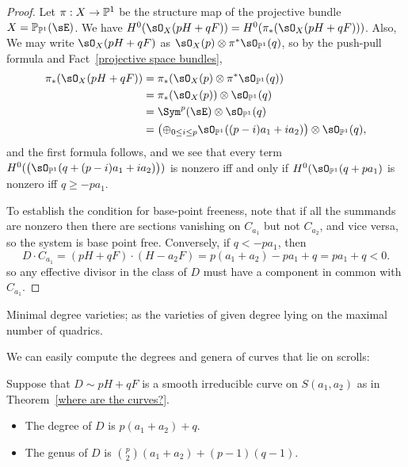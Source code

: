 \begin{proof} Let $\pi:X\to \PP^{1}$ be the structure map of the projective bundle $X = \PP_{\PP^{1}}(\sE)$.
We have $H^{0}(\sO_{X}(pH+qF)) = H^{0}(\pi_{*}(\sO_{X}(pH+qF)))$. Also, 
We may write $\sO_{X}(pH+qF)$ as $\sO_{X}(p) \otimes \pi^{*}\sO_{\PP^{1}}(q)$, so by the push-pull formula
and Fact~\ref{projective space bundles},
\begin{align*}
\pi_{*}(\sO_{X}(pH+qF)) &= \pi_{*}(\sO_{X}(p) \otimes \pi^{*}\sO_{\PP^{1}}(q)) \\
 &= \pi_{*}(\sO_{X}(p))\otimes \sO_{\PP^{1}}(q)\\
&=  \Sym^{p}(\sE)\otimes \sO_{\PP^{1}}(q)\\
&=  \bigl(\oplus_{0\leq i\leq p} \sO_{\PP^{1}}((p-i)a_{1}+i a_{2})\bigr) \otimes \sO_{\PP^{1}}(q),
\end{align*}
and the first formula follows, and we see that every term 
$H^{0}(\bigl(\sO_{\PP^{1}}(q + (p-i)a_{1}+i a_{2})\bigr))$ is nonzero iff and only if 
$H^{0}(\sO_{\PP^{1}}(q + pa_{1})$ is nonzero iff $q\geq -pa_{1}$.

To establish the condition for base-point freeness, note that if all the summands are nonzero then
there are sections  vanishing on $C_{a_{1}}$ but not $C_{a_{2}}$, and vice versa, so the system is base point free. Conversely, if $q<-pa_{1}$, then 
$$
D\cdot C_{a_{1}} = (pH+qF) \cdot (H-a_{2}F) = p(a_{1}+a_{2}) -pa_{1}+q = pa_{1}+q < 0.
$$
so any effective divisor in the class of $D$ must have a component in common with $C_{a_{1}}$.
\end{proof}



\begin{exercise} 
 Minimal degree varieties; as the varieties of given degree lying on the maximal number of quadrics.
\end{exercise}
 
We can easily compute the degrees and genera of curves that lie on scrolls:

\begin{proposition}
 Suppose that $D\sim pH+qF$ is a smooth irreducible curve on $S(a_{1}, a_{2})$ as in Theorem~\ref{where are the curves?}. 
\begin{itemize}
 \item The degree of $D$ is $p(a_{1}+a_{2}) +q$.
 \item The genus of $D$ is ${p\choose 2}(a_{1}+a_{2}) + (p-1)(q-1)$.
\end{itemize}
\end{proposition}
  
